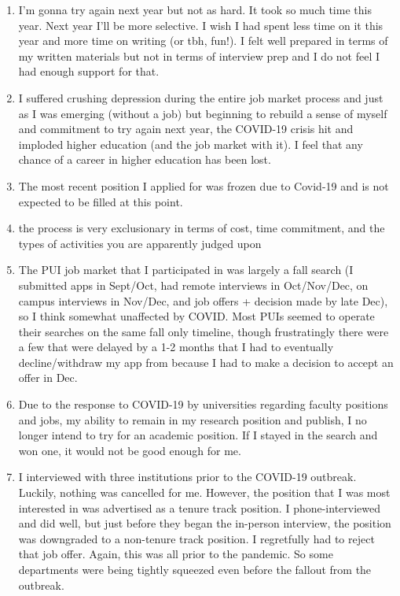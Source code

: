 \documentclass[]{article}
\begin{document}
\begin{enumerate}
\item
  I'm gonna try again next year but not as hard. It took so much time
  this year. Next year I'll be more selective. I wish I had spent less
  time on it this year and more time on writing (or tbh, fun!). I felt
  well prepared in terms of my written materials but not in terms of
  interview prep and I do not feel I had enough support for that.
\item
  I suffered crushing depression during the entire job market process
  and just as I was emerging (without a job) but beginning to rebuild a
  sense of myself and commitment to try again next year, the COVID-19
  crisis hit and imploded higher education (and the job market with it).
  I feel that any chance of a career in higher education has been lost.
\item
  The most recent position I applied for was frozen due to Covid-19 and
  is not expected to be filled at this point.
\item
  the process is very exclusionary in terms of cost, time commitment,
  and the types of activities you are apparently judged upon
\item
  The PUI job market that I participated in was largely a fall search (I
  submitted apps in Sept/Oct, had remote interviews in Oct/Nov/Dec, on
  campus interviews in Nov/Dec, and job offers + decision made by late
  Dec), so I think somewhat unaffected by COVID. Most PUIs seemed to
  operate their searches on the same fall only timeline, though
  frustratingly there were a few that were delayed by a 1-2 months that
  I had to eventually decline/withdraw my app from because I had to make
  a decision to accept an offer in Dec.
\item
  Due to the response to COVID-19 by universities regarding faculty
  positions and jobs, my ability to remain in my research position and
  publish, I no longer intend to try for an academic position. If I
  stayed in the search and won one, it would not be good enough for me.
\item
  I interviewed with three institutions prior to the COVID-19 outbreak.
  Luckily, nothing was cancelled for me. However, the position that I
  was most interested in was advertised as a tenure track position. I
  phone-interviewed and did well, but just before they began the
  in-person interview, the position was downgraded to a non-tenure track
  position. I regretfully had to reject that job offer. Again, this was
  all prior to the pandemic. So some departments were being tightly
  squeezed even before the fallout from the outbreak.

\end{enumerate}
\end{document}
